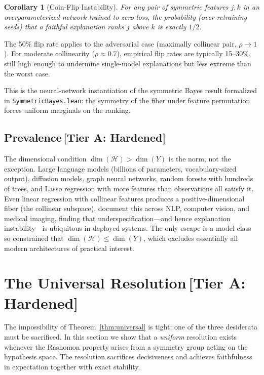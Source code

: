\documentclass[11pt,a4paper]{article}
\newtheorem{corollary}[theorem]{Corollary}
\newcommand{\sH}{\mathcal{H}}
\begin{document}
\begin{corollary}[Coin-Flip Instability]
\label{cor:coin-flip}
For any pair of symmetric features $j, k$ in an overparameterized network
trained to zero loss, the probability (over retraining seeds) that a
faithful explanation ranks $j$ above $k$ is exactly $1/2$.
\end{corollary}

\noindent
The 50\% flip rate applies to the adversarial case (maximally collinear pair, $\rho \to 1$). For moderate collinearity ($\rho \approx 0.7$), empirical flip rates are typically 15--30\%, still high enough to undermine single-model explanations but less extreme than the worst case.

\noindent
This is the neural-network instantiation of the symmetric Bayes
result formalized in \texttt{Symmetric\-Bayes.lean}: the symmetry
of the fiber under feature permutation forces uniform marginals on
the ranking.

\subsection{Prevalence\,\textnormal{\normalsize[Tier A: Hardened]}}
\label{sec:prevalence}

The dimensional condition $\dim(\sH) > \dim(Y)$ is the norm, not the
exception.  Large language models (billions of parameters, vocabulary-sized
output), diffusion models, graph neural networks, random forests with
hundreds of trees, and Lasso regression with more features than observations
all satisfy it.  Even linear regression with collinear features produces a
positive-dimensional fiber (the collinear subspace).
\citet{damour2022underspecification} document this across NLP,
computer vision, and medical imaging, finding that
underspecification---and hence explanation instability---is ubiquitous
in deployed systems.  The only escape is a model class so constrained
that $\dim(\sH) \leq \dim(Y)$, which excludes essentially all modern
architectures of practical interest.

\section{The Universal Resolution\,\textnormal{\normalsize[Tier A: Hardened]}}
\label{sec:resolution}

The impossibility of Theorem~\ref{thm:universal} is tight: one of the three
desiderata must be sacrificed.  In this section we show that a \emph{uniform}
resolution exists whenever the Rashomon property arises from a symmetry group
acting on the hypothesis space.  The resolution sacrifices decisiveness and
achieves faithfulness in expectation together with exact stability.
\end{document}
